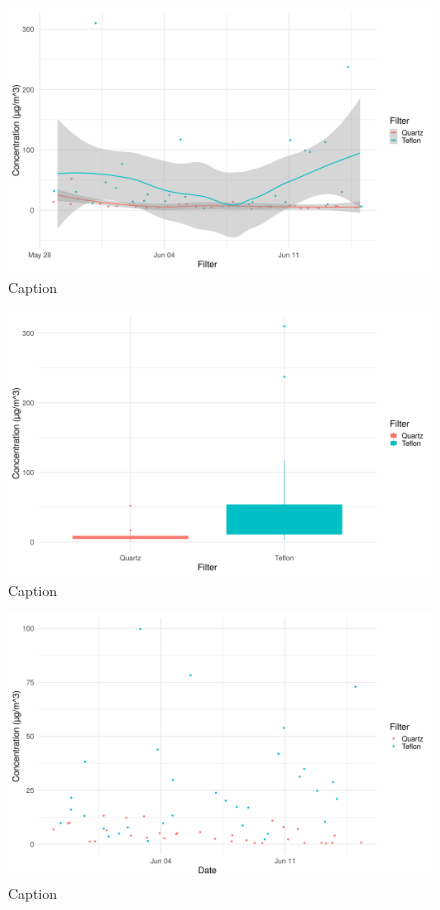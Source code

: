 \documentclass{nwureport}
\begin{document}
\begin{figure}[!htb]
    \centering
    \includegraphics[width=\textwidth]{images/pm25_autumn_jittersmooth.png}
    \caption{Caption}
    \label{fig:pm2.5_autumn_jitter_smooth}
\end{figure}

\begin{figure}[!htb]
    \centering
    \includegraphics[width=\textwidth]{images/pm25_autumn_box.png}
    \caption{Caption}
    \label{fig:pm2.5_autumn_box}
\end{figure}

\begin{figure}[!htb]
    \centering
    \includegraphics[width=\textwidth]{images/pm10_autumn_jitter.png}
    \caption{Caption}
    \label{fig:pm10_autumn_jitter}
\end{figure}
\end{document}
